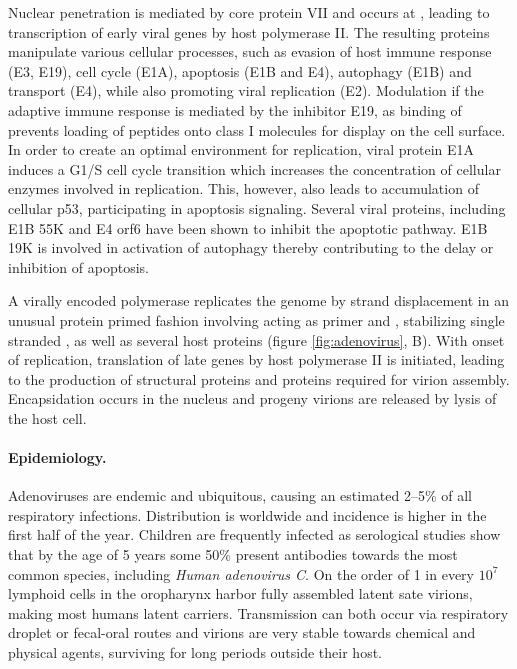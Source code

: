 Nuclear penetration is mediated by core protein VII and occurs at , leading to transcription of early viral genes by host  polymerase II. The resulting proteins manipulate various cellular processes, such as evasion of host immune response (E3, E19), cell cycle (E1A), apoptosis (E1B and E4), autophagy (E1B) and  transport (E4), while also promoting viral  replication (E2). Modulation if the adaptive immune response is mediated by the  inhibitor E19, as binding of  prevents loading of peptides onto  class I molecules for display on the cell surface. In order to create an optimal environment for replication, viral protein E1A induces a G1\slash S cell cycle transition which increases the concentration of cellular enzymes involved in  replication. This, however, also leads to accumulation of cellular p53, participating in apoptosis signaling. Several viral proteins, including E1B 55K and E4 orf6 have been shown to inhibit the apoptotic pathway. E1B 19K is involved in activation of autophagy thereby contributing to the delay or inhibition of apoptosis.

A virally encoded  polymerase replicates the genome by  strand displacement in an unusual protein primed fashion involving  acting as primer and , stabilizing single stranded , as well as several host proteins (figure \ref{fig:adenovirus}, B). With onset of replication, translation of late genes by host  polymerase II is initiated, leading to the production of structural proteins and proteins required for virion assembly. Encapsidation occurs in the nucleus and progeny virions are released by lysis of the host cell.

\paragraph{Epidemiology.}
Adenoviruses are endemic and ubiquitous, causing an estimated 2--5\% of all respiratory infections. Distribution is worldwide and incidence is higher in the first half of the year. Children are frequently infected as serological studies show that by the age of 5 years some 50\% present antibodies towards the most common species, including \textit{Human adenovirus C}. On the order of 1 in every $10^7$ lymphoid cells in the oropharynx harbor fully assembled latent sate virions, making most humans latent carriers. Transmission can both occur via respiratory droplet or fecal-oral routes and virions are very stable towards chemical and physical agents, surviving for long periods outside their host.

